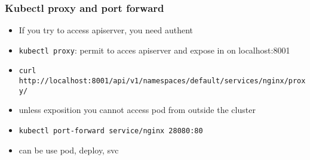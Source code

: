\subsubsection{Kubectl proxy and port forward}
\begin{frame}[fragile]{\subsubsecname}
  \begin{itemize}
  \item If you try to access apiserver, you need authent
  \item \texttt{kubectl proxy}: permit to acces apiserver and expose in on localhost:8001
  \item \texttt{curl http://localhost:8001/api/v1/namespaces/default/services/nginx/proxy/}
  \item unless exposition you cannot access pod from outside the cluster
  \item \texttt{kubectl port-forward service/nginx 28080:80}
  \item can be use pod, deploy, svc
  \end{itemize}
\end{frame}
